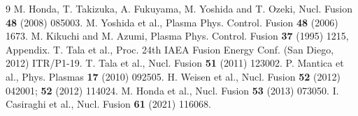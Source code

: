 \documentclass[11pt]{article}
\begin{document}
\begin{thebibliography}{9}
 M. Honda, T. Takizuka, A. Fukuyama, M. Yoshida and T. Ozeki,
  Nucl. Fusion \textbf{48} (2008) 085003.
 M. Yoshida et al., Plasma Phys. Control. Fusion \textbf{48} (2006) 1673.
 M. Kikuchi and M. Azumi, Plasma Phys. Control. Fusion \textbf{37} (1995) 1215,
  Appendix.
 T. Tala et al., Proc. 24th IAEA Fusion Energy Conf. (San Diego, 2012) ITR/P1-19.
 T. Tala et al., Nucl. Fusion \textbf{51} (2011) 123002.
 P. Mantica et al., Phys. Plasmas \textbf{17} (2010) 092505.
 H. Weisen et al., Nucl. Fusion \textbf{52} (2012) 042001; \textbf{52} (2012) 114024.
 M. Honda et al., Nucl. Fusion \textbf{53} (2013) 073050.
 I. Casiraghi et al., Nucl. Fusion \textbf{61} (2021) 116068.
\end{thebibliography}
\end{document}
